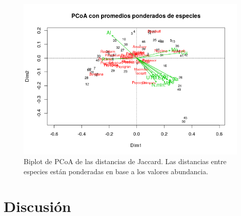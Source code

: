 \documentclass[11pt,]{article}
\begin{document}
\begin{figure}
\centering
\includegraphics{pcoa_sps_jacc_var_ambient.png}
\caption{Biplot de PCoA de las distancias de Jaccard. Las distancias
entre especies están ponderadas en base a los valores abundancia.
\label{fig:pcoa_sps_jacc_var_ambient}}
\end{figure}

\section{Discusión}\label{discusiuxf3n}
\end{document}
